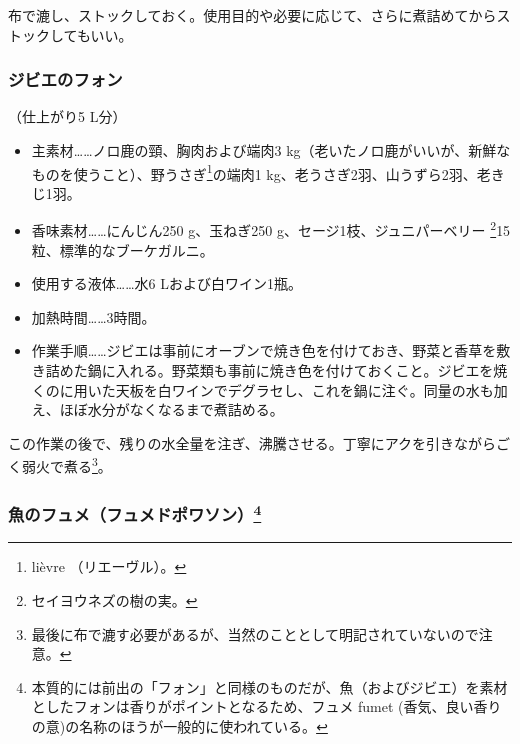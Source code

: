 \begin{recette}
布で漉し、ストックしておく。使用目的や必要に応じて、さらに煮詰めてからストックしてもいい。

\atoaki{}

\hypertarget{fonds-de-gibier}{%
\subsubsection{ジビエのフォン}\label{fonds-de-gibier}}


 

（仕上がり5 L分）

\begin{itemize}
\item
  主素材\ldots{}\ldots{}ノロ鹿の頸、胸肉および端肉3
  kg（老いたノロ鹿がいいが、新鮮なものを使うこと）、野うさぎ\footnote{lièvre
    （リエーヴル）。}の端肉1 kg、老うさぎ2羽、山うずら2羽、老きじ1羽。
\item
  香味素材\ldots{}\ldots{}にんじん250 g、玉ねぎ250
  g、セージ1枝、ジュニパーベリー \footnote{セイヨウネズの樹の実。}15粒、標準的なブーケガルニ。
\end{itemize}

\begin{itemize}
\item
  使用する液体\ldots{}\ldots{}水6 Lおよび白ワイン1瓶。
\item
  加熱時間\ldots{}\ldots{}3時間。
\item
  作業手順\ldots{}\ldots{}ジビエは事前にオーブンで焼き色を付けておき、野菜と香草を敷き詰めた鍋に入れる。野菜類も事前に焼き色を付けておくこと。ジビエを焼くのに用いた天板を白ワインでデグラセし、これを鍋に注ぐ。同量の水も加え、ほぼ水分がなくなるまで煮詰める。
\end{itemize}

この作業の後で、残りの水全量を注ぎ、沸騰させる。丁寧にアクを引きながらごく弱火で煮る\footnote{最後に布で漉す必要があるが、当然のこととして明記されていないので注意。}。

\atoaki{}

\hypertarget{fumet-de-poisson}{%
\subsubsection[魚のフュメ（フュメドポワソン）]{\texorpdfstring{魚のフュメ（フュメドポワソン）\footnote{本質的には前出の「フォン」と同様のものだが、魚（およびジビエ）を素材としたフォンは香りがポイントとなるため、フュメ
  fumet (香気、良い香りの意)の名称のほうが一般的に使われている。}}{魚のフュメ（フュメドポワソン）}}\label{fumet-de-poisson}}


\end{recette}
